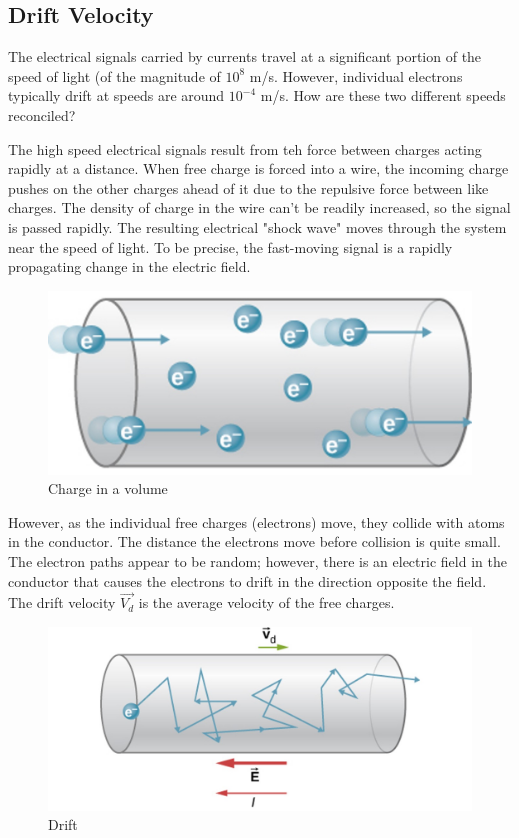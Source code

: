 \documentclass[14pt]{memoir}
\begin{document}
\subsection{Drift Velocity}

The electrical signals carried by currents travel at a significant portion of the speed of light (of the magnitude of $10^8$ m/s. However, individual electrons typically drift at speeds are around $10^{-4}$ m/s. How are these two different speeds reconciled?

The high speed electrical signals result from teh force between charges acting rapidly at a distance. When free charge is forced into a wire, the incoming charge pushes on the other charges ahead of it due to the repulsive force between like charges. The density of charge in the wire can't be readily increased, so the signal is passed rapidly. The resulting electrical "shock wave" moves through the system near the speed of light. To be precise, the fast-moving signal is a rapidly propagating change in the electric field. 

\begin{figure}[H]
\begin{center}
\includegraphics[scale=0.35]{fig/fig_09_07.jpg}
\caption{Charge in a volume}
\label{fig:09_07}
\end{center}
\end{figure}

However, as the individual free charges (electrons) move, they collide with atoms in the conductor. The distance the electrons move before collision is quite small. The electron paths appear to be random; however, there is an electric field in the conductor that causes the electrons to drift in the direction opposite the field. The drift velocity $\vec{V_d}$ is the average velocity of the free charges. 

\begin{figure}[H]
\begin{center}
\includegraphics[scale=0.50]{fig/fig_09_08.jpg}
\caption{Drift}
\label{fig:09_08}
\end{center}
\end{figure}
\end{document}
